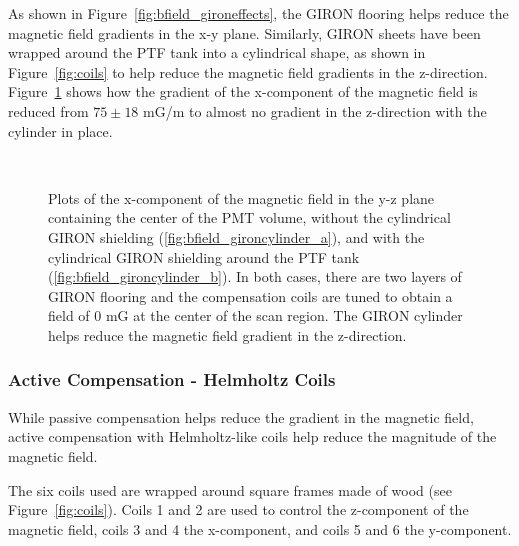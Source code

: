 As shown in Figure~\ref{fig:bfield_gironeffects}, the GIRON flooring helps reduce the magnetic field gradients in the x-y plane. Similarly, GIRON sheets have been wrapped around the PTF tank into a cylindrical shape, as shown in Figure~\ref{fig:coils} to help reduce the magnetic field gradients in the z-direction. Figure~\ref{fig:bfield_gironcylinder} shows how the gradient of the x-component of the magnetic field is reduced from $ 75\pm18 $ mG/m to almost no gradient in the z-direction with the cylinder in place.
%
\begin{figure}[htbp]
  \begin{center}
    \\
    \vspace{-3 mm}
  \caption{Plots of the x-component of the magnetic field in the y-z plane containing the center of the PMT volume, without the cylindrical GIRON shielding (\ref{fig:bfield_gironcylinder_a}), and with the cylindrical GIRON shielding around the PTF tank (\ref{fig:bfield_gironcylinder_b}). In both cases, there are two layers of GIRON flooring and the compensation coils are tuned to obtain a field of 0 mG at the center of the scan region. The GIRON cylinder helps reduce the magnetic field gradient in the z-direction.}
  \label{fig:bfield_gironcylinder}
  \end{center}
\end{figure}
%

\subsubsection{Active Compensation - Helmholtz Coils}

While passive compensation helps reduce the gradient in the magnetic field, active compensation with Helmholtz-like coils help reduce the magnitude of the magnetic field.

The six coils used are wrapped around square frames made of wood (see Figure~\ref{fig:coils}). Coils 1 and 2 are used to control the z-component of the magnetic field, coils 3 and 4 the x-component, and coils 5 and 6 the y-component.

